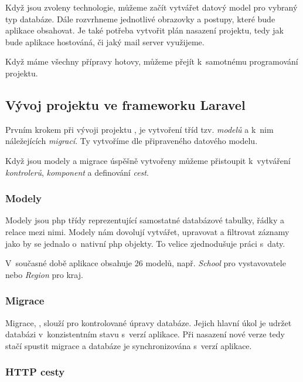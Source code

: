 Když jsou zvoleny technologie, můžeme začít vytvářet datový model pro vybraný typ databáze.
Dále rozvrhneme jednotlivé obrazovky a postupy, které bude aplikace obsahovat.
Je také potřeba vytvořit plán nasazení projektu, tedy jak bude aplikace hostováná, či jaký mail server využijeme.

Když máme všechny přípravy hotovy, můžeme přejít k~samotnému programování projektu.

\subsection{Vývoj projektu ve frameworku Laravel}
\label{sub:laravel-development}

Prvním krokem při vývoji projektu \inlaravel, je vytvoření tříd tzv. \emph{modelů}\cite{laravel-models} a k~nim náležejících \emph{migrací}\cite{laravel-migrations}. Ty vytvoříme dle připraveného datového modelu.

Když jsou modely a migrace úspěšně vytvořeny můžeme přistoupit k~vytváření \emph{kontrolerů}\cite{laravel-controller}, \emph{komponent}\cite{laravel-blade-component} a definování \emph{cest}\cite{laravel-routes}.

\subsubsection{Modely}

Modely jsou \acrshort{php} třídy reprezentující samostatné databázové tabulky, řádky a relace mezi nimi. Modely nám dovolují vytvářet, upravovat a filtrovat záznamy jako by se jednalo o~nativní \acrshort{php} objekty. To velice zjednodušuje práci s~daty.

V~současné době aplikace \bso{} obsahuje 26 modelů, např. \emph{School} pro vystavovatele nebo \emph{Region} pro kraj. 

\subsubsection{Migrace}

Migrace, \inlaravel, slouží pro kontrolované úpravy databáze. Jejich hlavní úkol je udržet databázi v~konzistentním stavu s~verzí aplikace. Při nasazení nové verze tedy stačí spustit migrace a databáze je synchronizována s~verzí aplikace.

\subsubsection{HTTP cesty}


